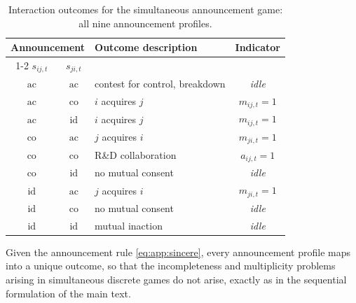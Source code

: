 \begin{table}[htbp]
\centering
\begin{threeparttable}
\caption{\label{tab:outcomes} Interaction outcomes for the simultaneous
announcement game: all nine announcement profiles.}
\begin{tabular}{@{} c c l c @{}}
\toprule
\multicolumn{2}{c}{Announcement} & \multirow{2}{*}{Outcome description} & \multirow{2}{*}{Indicator} \\
\cmidrule(r){1-2}
$s_{ij,t}$ & $s_{ji,t}$ &  &  \\
\midrule
$\mathrm{ac}$ & $\mathrm{ac}$ & contest for control, breakdown & \textit{idle} \\
$\mathrm{ac}$ & $\mathrm{co}$ & $i$ acquires $j$ & $m_{ij,t}=1$ \\
$\mathrm{ac}$ & $\mathrm{id}$ & $i$ acquires $j$ & $m_{ij,t}=1$ \\
$\mathrm{co}$ & $\mathrm{ac}$ & $j$ acquires $i$ & $m_{ji,t}=1$ \\
$\mathrm{co}$ & $\mathrm{co}$ & R\&D collaboration & $a_{ij,t}=1$ \\
$\mathrm{co}$ & $\mathrm{id}$ & no mutual consent & \textit{idle} \\
$\mathrm{id}$ & $\mathrm{ac}$ & $j$ acquires $i$ & $m_{ji,t}=1$ \\
$\mathrm{id}$ & $\mathrm{co}$ & no mutual consent & \textit{idle} \\
$\mathrm{id}$ & $\mathrm{id}$ & mutual inaction & \textit{idle} \\
\bottomrule
\end{tabular}
\end{threeparttable}
\end{table}
Given the announcement rule \eqref{eq:app:sincere}, every announcement
profile maps into a unique outcome, so that the incompleteness and
multiplicity problems arising in simultaneous discrete games
\citep{tamer2003incomplete,bresnahan1991empirical,depaula2013econometric}
do not arise, exactly as in the sequential formulation of the main
text.

